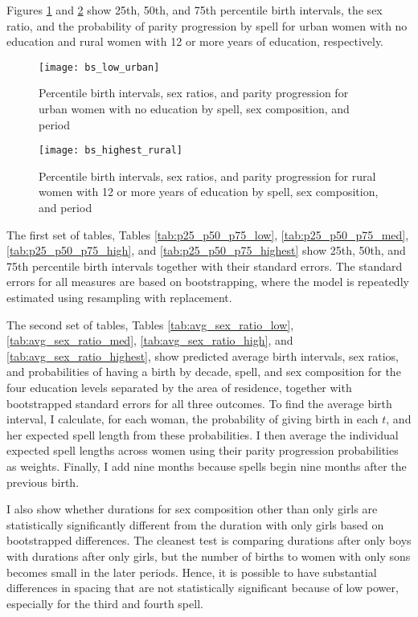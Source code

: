 \documentclass[12pt,letterpaper]{article}
\begin{document}
Figures \ref{fig:spacing_low_urban} and \ref{fig:spacing_highest_rural} show 25th, 50th,
and 75th percentile birth intervals, the sex ratio, and the probability of parity
progression by spell for urban women with no education and rural women with 12 or
more years of education, respectively.

\begin{figure}
\centering
\texttt{[image: bs\_low\_urban]}
\caption{Percentile birth intervals, sex ratios, and parity progression  
for urban women with no education by spell, sex composition, and period}
\label{fig:spacing_low_urban}
\end{figure}

\begin{figure}
\centering
\texttt{[image: bs\_highest\_rural]}
\caption{Percentile birth intervals, sex ratios, and parity progression  
for rural women with 12 or more years of education by spell, sex composition, and period}
\label{fig:spacing_highest_rural}
\end{figure}



The first set of tables, Tables \ref{tab:p25_p50_p75_low}, \ref{tab:p25_p50_p75_med},
\ref{tab:p25_p50_p75_high}, and \ref{tab:p25_p50_p75_highest} show 25th, 50th, and
75th percentile birth intervals together with their standard errors.
The standard errors for all measures are based on bootstrapping,
where the model is repeatedly estimated using resampling with replacement.

The second set of tables, 
Tables \ref{tab:avg_sex_ratio_low}, \ref{tab:avg_sex_ratio_med}, 
\ref{tab:avg_sex_ratio_high}, and \ref{tab:avg_sex_ratio_highest}, show predicted average 
birth intervals, sex ratios, and probabilities of having a birth by decade, spell, and sex 
composition for the four education levels separated by the area of residence, together 
with bootstrapped standard errors for all three outcomes.
To find the average birth interval, I calculate, for each woman, the probability of 
giving birth in each $t$, and her expected spell length from these probabilities. 
I then average the individual expected spell lengths across women using their parity 
progression probabilities as weights. Finally, I add nine months because spells begin 
nine months after the previous birth.

I also show whether durations for sex composition other than only girls are statistically 
significantly different from the duration with only girls based on bootstrapped 
differences. 
The cleanest test is comparing durations after only boys with durations after
only girls, but the number of births to women with only sons becomes small 
in the later periods.
Hence, it is possible to have substantial differences in spacing that are
not statistically significant because of low power, especially for the third 
and fourth spell.
\end{document}
